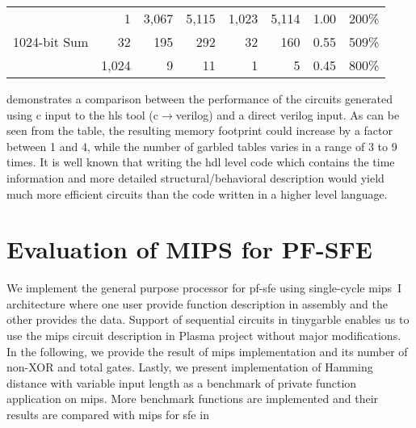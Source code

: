 \begin{table}
{\begin{tabular}{l|r||rr||rr||rr}
\multirow{3}{*}{1024-bit Sum}      & 1                                       & 3,067                       & 5,115                            & 1,023                       & 5,114                            & 1.00                    & 200\%                   \\
                                   & 32                                      & 195                         & 292                              & 32                          & 160                              & 0.55                    & 509\%                   \\
                                   & 1,024                                   & 9                           & 11                               & 1                           & 5                                & 0.45                    & 800\%
\end{tabular}
}
\end{table}

 demonstrates a comparison between the performance of the circuits generated using \gls{c} input to the \acrshort{hls} tool (\gls{c}$\rightarrow$\gls{verilog}) and a direct \gls{verilog} input.
As can be seen from the table, the resulting memory footprint could increase by a factor between 1 and 4, while the number of garbled tables varies in a range of 3 to 9 times.
It is well known that writing the \acrshort{hdl} level code which contains the time information and more detailed structural/behavioral description would yield much more efficient circuits than the code written in a higher level language.

\section{Evaluation of MIPS for PF-SFE} \label{sec:eval-mips-pf-sfe}
We implement the general purpose processor for \acrshort{pf-sfe} using single-cycle \gls{mips}~I architecture where one user provide function description in assembly and the other provides the data.
Support of sequential circuits in \gls{tinygarble} enables us to use the \gls{mips} circuit description in Plasma project \cite{rhoads2006plasma} without major modifications.
In the following, we provide the result of \gls{mips} implementation and its number of non-XOR and total gates.
Lastly, we present implementation of Hamming distance with variable input length as a benchmark of private function application on \gls{mips}.
More benchmark functions are implemented and their results are compared with \gls{mips} for \gls{sfe} in 


